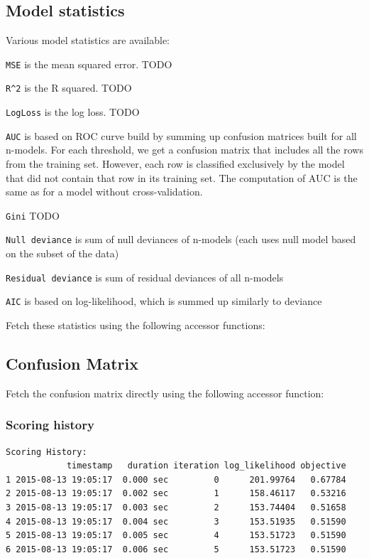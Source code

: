 \subsection{Model statistics}

Various model statistics are available:

\texttt{MSE} is the mean squared error.  TODO

\texttt{R\textasciicircum2} is the R squared.  TODO

\texttt{LogLoss} is the log loss.  TODO

\texttt{AUC} is based on ROC curve build  by summing up confusion matrices built for all n-models.
For each threshold, we get a confusion matrix that includes all the rows from the training set. However, each row
is classified exclusively by the model that did not contain that row in its training set. The computation of AUC is
the same as for a model without cross-validation.

\texttt{Gini}  TODO

\texttt{Null deviance} is sum of null deviances of n-models (each uses null model based on the subset of the data)

\texttt{Residual deviance} is sum of residual deviances of all n-models

\texttt{AIC} is based on log-likelihood, which is summed up similarly to deviance

Fetch these statistics using the following accessor functions:



\subsection{Confusion Matrix}

Fetch the confusion matrix directly using the following accessor function:



\subsubsection{Scoring history}


\begin{lstlisting}[style=output]
Scoring History:
            timestamp   duration iteration log_likelihood objective
1 2015-08-13 19:05:17  0.000 sec         0      201.99764   0.67784
2 2015-08-13 19:05:17  0.002 sec         1      158.46117   0.53216
3 2015-08-13 19:05:17  0.003 sec         2      153.74404   0.51658
4 2015-08-13 19:05:17  0.004 sec         3      153.51935   0.51590
5 2015-08-13 19:05:17  0.005 sec         4      153.51723   0.51590
6 2015-08-13 19:05:17  0.006 sec         5      153.51723   0.51590
\end{lstlisting}

